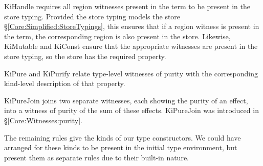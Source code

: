 KiHandle requires all region witnesses present in the term to be present in the store typing. Provided the store typing models the store \S\ref{Core:Simplified:StoreTypings}, this ensures that if a region witness is present in the term, the corresponding region is also present in the store. Likewise, KiMutable and KiConst ensure that the appropriate witnesses are present in the store typing, so the store has the required property.

KiPure and KiPurify relate type-level witnesses of purity with the corresponding kind-level description of that property.

KiPureJoin joins two separate witnesses, each showing the purity of an effect, into a witness of purity of the sum of these effects. KiPureJoin was introduced in \S\ref{Core:Witnesses:purity}.

The remaining rules give the kinds of our type constructors. We could have arranged for these kinds to be present in the initial type environment, but present them as separate rules due to their built-in nature. 

\clearpage{}




